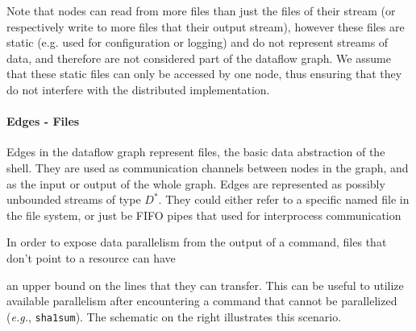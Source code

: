 \documentclass[sigplan,10pt,review,anonymous]{acmart}
\newcommand{\eg}{{\em e.g.}, }
\newcommand{\ttt}[1]{\texttt{\small #1}}
\newcommand{\TODO}[1]{\hl{\textbf{TODO:} #1}\xspace}
\newcommand{\kstar}{^{\textstyle *}}
\begin{document}
Note that nodes can read from more files than just the files of their
stream (or respectively write to more files that their output stream),
however these files are static (e.g. used for configuration or
logging) and do not represent streams of data, and therefore are not
considered part of the dataflow graph. We assume that these static
files can only be accessed by one node, thus ensuring that they do not
interfere with the distributed implementation.

\paragraph{Edges - Files}

Edges in the dataflow graph represent files, the basic data
abstraction of the shell. They are used as communication channels
between nodes in the graph, and as the input or output of the whole
graph. Edges are represented as possibly unbounded streams of type
$D\kstar$. They could either refer to a specific named file in the file
system, or just be FIFO pipes that used for interprocess communication




In order to expose data parallelism from the output of a command, files that
don't point to a resource can have
\begin{wrapfigure}[3]{r}{0.20\columnwidth}
\vspace{-7pt}
  \texttt{[image: \\detokenize\{./figs/dish\_g2.pdf]}}
\vspace{-20pt}
\end{wrapfigure}
an upper bound on the lines that they can transfer. This can be useful to utilize available
parallelism after encountering a command that cannot be parallelized
(\eg \ttt{sha1sum}). The schematic on the right illustrates this scenario.
\end{document}
